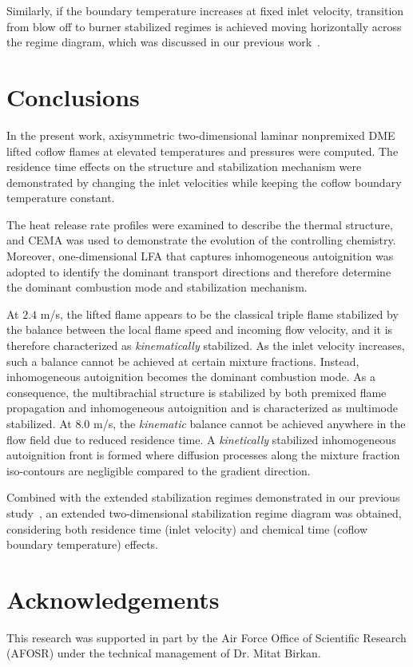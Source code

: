 \documentclass{wssci}
\begin{document}
Similarly, if the boundary temperature increases at fixed inlet velocity, transition from blow off to burner stabilized regimes is achieved moving horizontally across the regime diagram, which was discussed in our previous work~\cite{deng15}.     


\section{Conclusions}

In the present work, axisymmetric two-dimensional laminar nonpremixed DME lifted coflow flames at elevated temperatures and pressures were computed.  The residence time effects on the structure and stabilization mechanism were demonstrated by changing the inlet velocities while keeping the coflow boundary temperature constant.

The heat release rate profiles were examined to describe the thermal structure, and CEMA was used to demonstrate the evolution of the controlling chemistry.  Moreover, one-dimensional LFA that captures inhomogeneous autoignition was adopted to identify the dominant transport directions and therefore determine the dominant combustion mode and stabilization mechanism.

At $2.4$ m/s, the lifted flame appears to be the classical triple flame stabilized by the balance between the local flame speed and incoming flow velocity, and it is therefore characterized as \emph {kinematically} stabilized.  As the inlet velocity increases, such a balance cannot be achieved at certain mixture fractions.  Instead, inhomogeneous autoignition becomes the dominant combustion mode.  As a consequence, the multibrachial structure is stabilized by both premixed flame propagation and inhomogeneous autoignition and is characterized as multimode stabilized.  At $8.0$ m/s, the \emph{kinematic} balance cannot be achieved anywhere in the flow field due to reduced residence time.  A \emph {kinetically} stabilized inhomogeneous autoignition front is formed where diffusion processes along the mixture fraction iso-contours are negligible compared to the gradient direction.

Combined with the extended stabilization regimes demonstrated in our previous study~\cite{deng15}, an extended two-dimensional stabilization regime diagram was obtained, considering both residence time (inlet velocity) and chemical time (coflow boundary temperature) effects.  


\section{Acknowledgements}

This research was supported in part by the Air Force Office of Scientific Research (AFOSR) under the technical management of Dr. Mitat Birkan.


 
\end{document}
